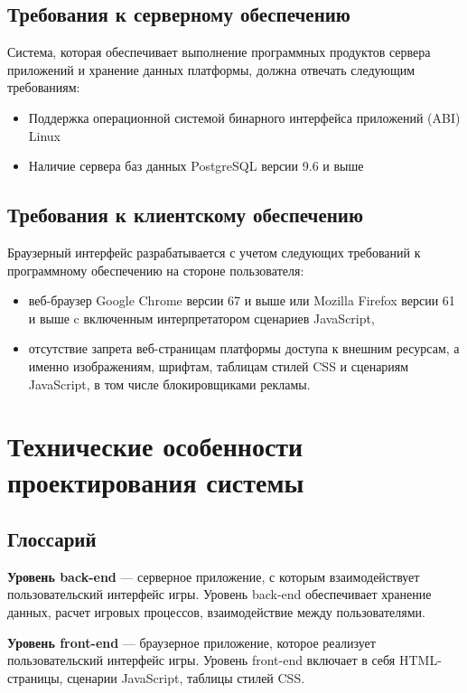 \documentclass[12pt, a4paper]{article}
\begin{document}
\subsection{Требования к серверному обеспечению}

Система, которая обеспечивает выполнение программных продуктов сервера приложений
и хранение данных платформы, должна отвечать следующим требованиям:

\begin{itemize}
\item Поддержка операционной системой бинарного интерфейса приложений (ABI) Linux
\item Наличие сервера баз данных PostgreSQL версии 9.6 и выше
\end{itemize}

\subsection{Требования к клиентскому обеспечению}

Браузерный интерфейс разрабатывается с учетом следующих требований к
программному обеспечению на стороне пользователя:

\begin{itemize}
\item веб-браузер Google Chrome версии 67 и выше или
Mozilla Firefox версии 61 и выше c включенным интерпретатором сценариев JavaScript,
\item отсутствие запрета веб-страницам платформы доступа к внешним ресурсам,
а именно изображениям, шрифтам, таблицам стилей CSS и сценариям JavaScript,
в том числе блокировщиками рекламы.
\end{itemize}

\section{Технические особенности проектирования системы}

\subsection{Глоссарий}

\textbf{Уровень back-end} — серверное приложение, с которым взаимодействует
пользовательский интерфейс игры. Уровень back-end обеспечивает хранение данных,
расчет игровых процессов, взаимодействие между пользователями.

\textbf{Уровень front-end} — браузерное приложение, которое реализует
пользовательский интерфейс игры. Уровень front-end включает в себя
HTML-страницы, сценарии JavaScript, таблицы стилей CSS.
\end{document}
